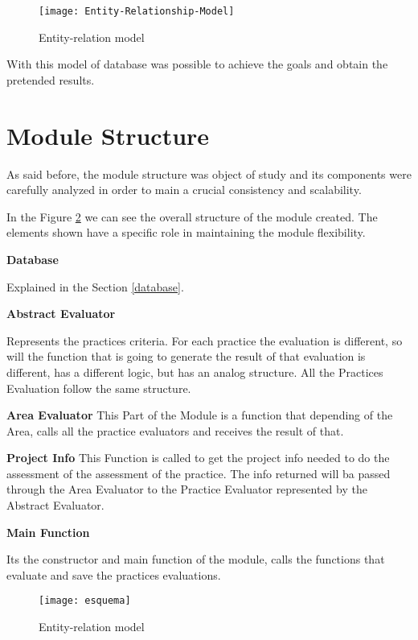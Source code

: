 \begin{figure}[h]
	\begin{center}
		\leavevmode
		\texttt{[image: Entity-Relationship-Model]}
		\caption{Entity-relation model}
		\label{fig:entity-relation}
	\end{center}
\end{figure}

With this model of database was possible to achieve the goals and obtain the pretended results.

\section{Module Structure}

As said before, the module structure was object of study and its components were carefully analyzed in order to main a crucial consistency and scalability.

In the Figure \ref{fig:esquema} we can see the overall structure of the module created. The elements shown have a specific role in maintaining the module flexibility. 

\textbf{Database}

Explained in the Section \ref{database}.

\textbf{Abstract Evaluator}

Represents the practices criteria. For each practice the evaluation is different, so will the function that is going to generate the result of that evaluation is different, has a different logic, but has an analog structure. All the Practices Evaluation follow the same structure.

\textbf{Area Evaluator}
This Part of the Module is a function that depending of the Area, calls all the practice evaluators and receives the result of that.


\textbf{Project Info}
This Function is called to get the project info needed to do the assessment of the assessment of the practice. The info returned will ba passed through the Area Evaluator to the Practice Evaluator represented by the Abstract Evaluator.

\textbf{Main Function}

Its the constructor and main function of the module, calls the functions that evaluate and save the practices evaluations.

\begin{landscape}
\begin{figure}[f]
	\begin{center}
		\leavevmode
		\texttt{[image: esquema]}
		\caption{Entity-relation model}
		\label{fig:esquema}
	\end{center}
\end{figure}
\end{landscape}

